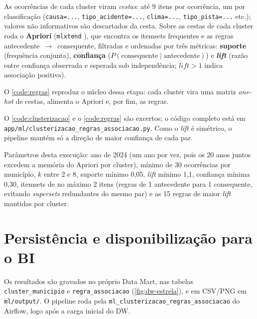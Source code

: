 As ocorrências de cada cluster viram \textit{cestas}: até 9 itens por
ocorrência, um por classificação (\texttt{causa=...},
\texttt{tipo\_acidente=...}, \texttt{clima=...}, \texttt{tipo\_pista=...}
etc.); valores não informativos são descartados da cesta. Sobre as cestas de
cada cluster roda o \textbf{Apriori} \cite{agrawal1994} (\texttt{mlxtend}
\cite{raschka2018}), que encontra os itemsets frequentes e as regras
antecedente~$\rightarrow$~consequente, filtradas e ordenadas por três
métricas: \textbf{suporte} (frequência conjunta), \textbf{confiança}
($P(\text{consequente} \mid \text{antecedente})$) e \textbf{\textit{lift}}
(razão entre confiança observada e esperada sob independência;
$\textit{lift}>1$ indica associação positiva).

O \autoref{code:regras} reproduz o núcleo dessa etapa: cada cluster vira uma
matriz \textit{one-hot} de cestas, alimenta o Apriori e, por fim, as regras.

\begin{center}
  \begin{codigo}[H]
    \small
    
    \caption{Apriori e regras de associação, por cluster}
    \label{code:regras}
  \end{codigo}
\end{center}

O \autoref{code:clusterizacao} e o \autoref{code:regras} são excertos; o
código completo está em \texttt{app/ml/clusterizacao\_regras\_associacao.py}.
Como o \textit{lift} é simétrico, o pipeline mantém só a direção de maior
confiança de cada par.

Parâmetros desta execução: ano de 2024 (um ano por vez, pois os 20 anos
juntos excedem a memória do Apriori por cluster), mínimo de 30 ocorrências
por município, $k$ entre 2 e 8, suporte mínimo 0,05, \textit{lift} mínimo
1,1, confiança mínima 0,30, itemsets de no máximo 2 itens (regras de 1
antecedente para 1 consequente, evitando \textit{supersets} redundantes do
mesmo par) e as 15 regras de maior \textit{lift} mantidas por cluster.

\section{Persistência e disponibilização para o BI}
\label{sec:persistencia}

Os resultados são gravados no próprio Data Mart, nas tabelas
\texttt{cluster\_municipio} e \texttt{regra\_associacao}
(\autoref{fig:dw-estrela}), e em CSV/PNG em \texttt{ml/output/}. O pipeline
roda pela 
\texttt{ml\_clusterizacao\_regras\_associacao} do Airflow, logo após a carga
inicial do DW.

